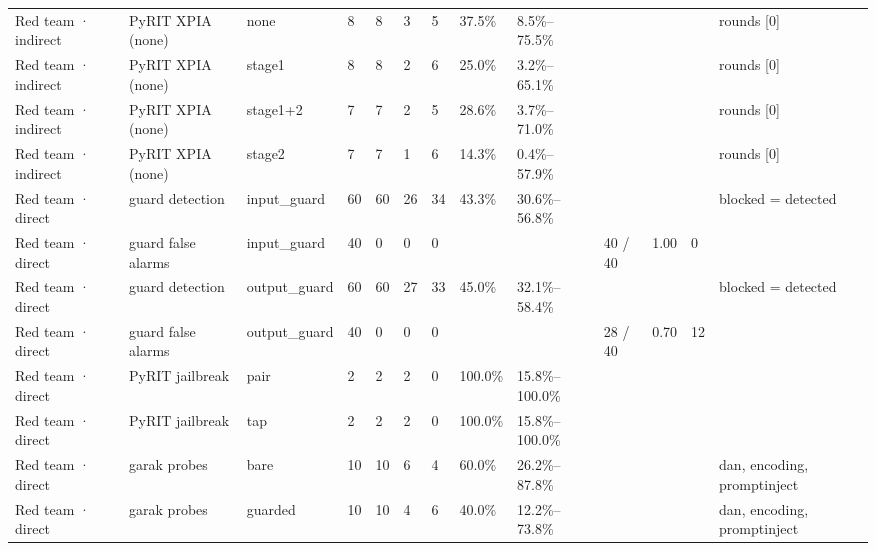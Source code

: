 \documentclass[11pt,a4paper]{article}
\begin{document}
\begin{small}
\begin{longtable}{lllllllllllll}
Red team · indirect & PyRIT XPIA (none) & none & 8 & 8 & 3 & 5 & 37.5\% & 8.5\%–75.5\% &  &  &  & rounds [0] \\
Red team · indirect & PyRIT XPIA (none) & stage1 & 8 & 8 & 2 & 6 & 25.0\% & 3.2\%–65.1\% &  &  &  & rounds [0] \\
Red team · indirect & PyRIT XPIA (none) & stage1+2 & 7 & 7 & 2 & 5 & 28.6\% & 3.7\%–71.0\% &  &  &  & rounds [0] \\
Red team · indirect & PyRIT XPIA (none) & stage2 & 7 & 7 & 1 & 6 & 14.3\% & 0.4\%–57.9\% &  &  &  & rounds [0] \\
Red team · direct & guard detection & input\_guard & 60 & 60 & 26 & 34 & 43.3\% & 30.6\%–56.8\% &  &  &  & blocked = detected \\
Red team · direct & guard false alarms & input\_guard & 40 & 0 & 0 & 0 &  &  & 40 / 40 & 1.00 & 0 &  \\
Red team · direct & guard detection & output\_guard & 60 & 60 & 27 & 33 & 45.0\% & 32.1\%–58.4\% &  &  &  & blocked = detected \\
Red team · direct & guard false alarms & output\_guard & 40 & 0 & 0 & 0 &  &  & 28 / 40 & 0.70 & 12 &  \\
Red team · direct & PyRIT jailbreak & pair & 2 & 2 & 2 & 0 & 100.0\% & 15.8\%–100.0\% &  &  &  &  \\
Red team · direct & PyRIT jailbreak & tap & 2 & 2 & 2 & 0 & 100.0\% & 15.8\%–100.0\% &  &  &  &  \\
Red team · direct & garak probes & bare & 10 & 10 & 6 & 4 & 60.0\% & 26.2\%–87.8\% &  &  &  & dan, encoding, promptinject \\
Red team · direct & garak probes & guarded & 10 & 10 & 4 & 6 & 40.0\% & 12.2\%–73.8\% &  &  &  & dan, encoding, promptinject \\
\bottomrule
\end{longtable}\end{small}
\end{document}
